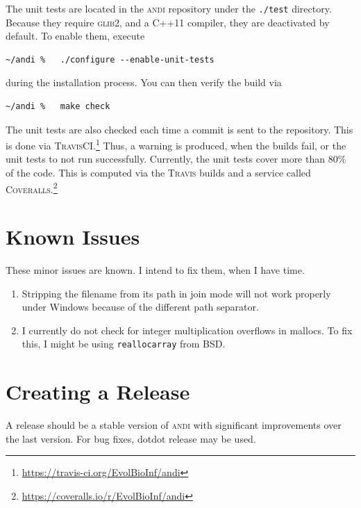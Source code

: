 \documentclass[a4paper,
  10pt,
  english,
  DIV=12,
  BCOR=8mm]{scrbook}
\newcommand{\algo}[1]{\textsc{{#1}}}
\newcommand{\andi}{\algo{andi} }
\begin{document}
The unit tests are located in the \andi repository under the \lstinline$./test$ directory. Because they require \algo{glib2}, and a C++11 compiler, they are deactivated by default. To enable them, execute

\begin{lstlisting}
~/andi %   ./configure --enable-unit-tests
\end{lstlisting}

\noindent during the installation process. You can then verify the build via 

\begin{lstlisting}
~/andi %   make check
\end{lstlisting}

\noindent The unit tests are also checked each time a commit is sent to the repository. This is done via \algo{TravisCI}.\footnote{\url{https://travis-ci.org/EvolBioInf/andi}} Thus, a warning is produced, when the builds fail, or the unit tests to not run successfully. Currently, the unit tests cover more than 80\% of the code. This is computed via the \algo{Travis} builds and a service called \algo{Coveralls}.\footnote{\url{https://coveralls.io/r/EvolBioInf/andi}}

\section{Known Issues}

These minor issues are known. I intend to fix them, when I have time.

\begin{enumerate}
  \item Stripping the filename from its path in join mode will not work properly under Windows because of the different path separator.
  \item I currently do not check for integer multiplication overflows in mallocs. To fix this, I might be using \lstinline$reallocarray$ from BSD.
\end{enumerate}


\section{Creating a Release}

A release should be a stable version of \andi with significant improvements over the last version. For bug fixes, dotdot release may be used.

\end{document}
